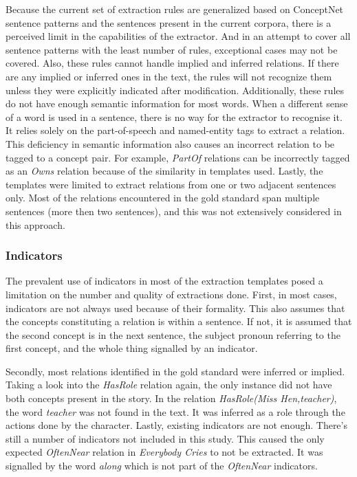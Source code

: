 Because the current set of extraction rules are generalized based on ConceptNet sentence patterns and the sentences present in the current corpora, there is a perceived limit in the capabilities of the extractor. And in an attempt to cover all sentence patterns with the least number of rules, exceptional cases may not be covered. Also, these rules cannot handle implied and inferred relations. If there are any implied or inferred ones in the text, the rules will not recognize them unless they were explicitly indicated after modification. Additionally, these rules do not have enough semantic information for most words. When a different sense of a word is used in a sentence, there is no way for the extractor to recognise it. It relies solely on the part-of-speech and named-entity tags to extract a relation. This deficiency in semantic information also causes an incorrect relation to be tagged to a concept pair. For example, \textit{PartOf} relations can be incorrectly tagged as an \textit{Owns} relation because of the similarity in templates used. Lastly, the templates were limited to extract relations from one or two adjacent sentences only. Most of the relations encountered in the gold standard span multiple sentences (more then two sentences), and this was not extensively considered in this approach.

\subsubsection{Indicators}
\label{sec:indicators}

The prevalent use of indicators in most of the extraction templates posed a limitation on the number and quality of extractions done. First, in most cases, indicators are not always used because of their formality. This also assumes that the concepts constituting a relation is within a sentence. If not, it is assumed that the second concept is in the next sentence, the subject pronoun referring to the first concept, and the whole thing signalled by an indicator.

Secondly, most relations identified in the gold standard were inferred or implied. Taking a look into the \textit{HasRole} relation again, the only instance did not have both concepts present in the story. In the relation \textit{HasRole(Miss Hen,teacher)}, the word \textit{teacher} was not found in the text. It was inferred as a role through the actions done by the character. Lastly, existing indicators are not enough. There's still a number of indicators not included in this study. This caused the only expected \textit{OftenNear} relation in \textit{Everybody Cries} to not be extracted. It was signalled by the word \textit{along} which is not part of the \textit{OftenNear} indicators.

